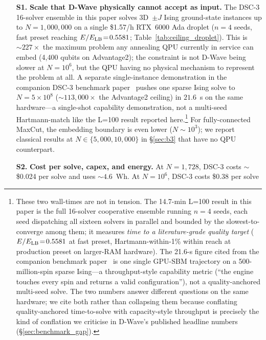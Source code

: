 \documentclass[11pt,a4paper]{article}
\begin{document}
\begin{enumerate}\itemsep0.2em
\item[\textbf{S1.}] \textbf{Scale that D-Wave physically cannot accept
  as input.} The DSC-3 16-solver ensemble in this paper solves
  3D~$\pm J$ Ising ground-state instances up to $N\!=\!1{,}000{,}000$
  on a single \$1.57/h RTX~6000 Ada droplet ($n\!=\!4$ seeds, fast
  preset reaching $E/E_{\rm LB}\!=\!0.5581$;
  Table~\ref{tab:ceiling_droplet}). This is $\sim\!227\times$ the
  maximum problem any annealing QPU currently in service can embed
  (4{,}400 qubits on Advantage2); the constraint is not D-Wave being
  slower at $N\!=\!10^6$, but the QPU having no physical mechanism
  to represent the problem at all. A separate single-instance
  demonstration in the companion DSC-3 benchmark
  paper~\cite{daugherty_dsc3_benchmark} pushes one sparse Ising solve
  to $N\!=\!5\!\times\!10^{8}$ ($\sim\!113{,}000\times$ the
  Advantage2 ceiling) in $21.6$~s on the same hardware---a
  single-shot capability demonstration, not a multi-seed
  Hartmann-match like the L=100 result reported here.\footnote{%
  These two wall-times are not in tension. The 14.7-min L=100 result
  in this paper is the full 16-solver cooperative ensemble running
  $n\!=\!4$ seeds, each seed dispatching all sixteen solvers in
  parallel and bounded by the slowest-to-converge among them; it
  measures \emph{time to a literature-grade quality target}
  ($E/E_{\rm LB}\!=\!0.5581$ at fast preset, Hartmann-within-1\%
  within reach at production preset on larger-RAM hardware). The
  21.6-s figure cited from the companion benchmark
  paper~\cite{daugherty_dsc3_benchmark} is one single GPU-SBM
  trajectory on a 500-million-spin sparse Ising---a
  throughput-style capability metric (``the engine touches every
  spin and returns a valid configuration''), not a quality-anchored
  multi-seed solve. The two numbers answer different questions
  on the same hardware; we cite both rather than collapsing them
  because conflating quality-anchored time-to-solve with
  capacity-style throughput is precisely the kind of conflation we
  criticise in D-Wave's published headline numbers (\S\ref{sec:benchmark_gap}).} For
  fully-connected MaxCut, the embedding boundary is even lower
  ($N\!\sim\!10^{3}$); we report classical results at
  $N\!\in\!\{5{,}000, 10{,}000\}$ in \S\ref{sec:b3} that have no QPU
  counterpart.
\item[\textbf{S2.}] \textbf{Cost per solve, capex, and energy.} At
  $N\!=\!1{,}728$, DSC-3 costs $\sim$\$0.024 per solve and uses
  $\sim\!4.6$~Wh. At $N\!=\!10^{6}$, DSC-3 costs \$0.38 per solve

\end{enumerate}
\end{document}
